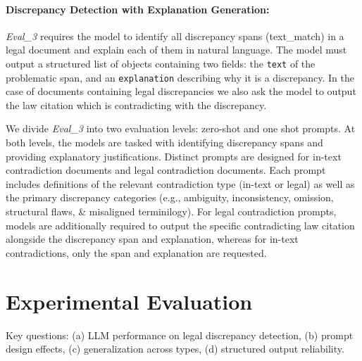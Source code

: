 \documentclass[11pt]{article}
\begin{document}
\paragraph{Discrepancy Detection with Explanation Generation:}

\textit{Eval\_3} requires the model to identify all discrepancy spans (text\_match) in a legal document and explain each of them in natural language. The model must output a structured list of objects containing two fields: the \texttt{text} of the problematic span, and an \texttt{explanation} describing why it is a discrepancy. In the case of documents containing legal discrepancies we also ask the model to output the law citation which is contradicting with the discrepancy.

We divide \textit{Eval\_3} into two evaluation levels: zero-shot and one shot prompts. At both levels, the models are tasked with identifying discrepancy spans and providing explanatory justifications. Distinct prompts are designed for in-text contradiction documents and legal contradiction documents. Each prompt includes definitions of the relevant contradiction type (in-text or legal) as well as the primary discrepancy categories (e.g., ambiguity, inconsistency, omission, structural flaws, \& misaligned terminilogy). For legal contradiction prompts, models are additionally required to output the specific contradicting law citation alongside the discrepancy span and explanation, whereas for in-text contradictions, only the span and explanation are requested.




\section{Experimental Evaluation}

Key questions: (a) LLM performance on legal discrepancy detection, (b) prompt design effects, (c) generalization across types, (d) structured output reliability. 
\end{document}
